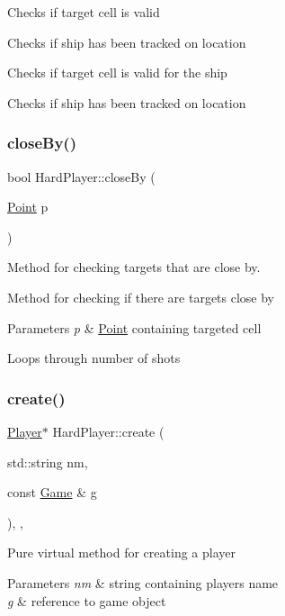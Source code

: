 Checks if target cell is valid

Checks if ship has been tracked on location

Checks if target cell is valid for the ship

Checks if ship has been tracked on location \mbox{\label{class_hard_player_a91cdd6239e111ea02bff561f6a3a0c41}} 
\subsubsection{\texorpdfstring{close\+By()}{closeBy()}}
{\footnotesize\ttfamily bool Hard\+Player\+::close\+By (\begin{DoxyParamCaption}\item[{\mbox{\hyperlink{class_point}{Point}}}]{p }\end{DoxyParamCaption})}



Method for checking target\textquotesingle{}s that are close by. 

Method for checking if there are targets close by 
\begin{DoxyParams}{Parameters}
{\em p} & \mbox{\hyperlink{class_point}{Point}} containing targeted cell \\
\hline
\end{DoxyParams}
Loops through number of shots \mbox{\label{class_hard_player_aa435bcb65ee8b3aea7553196c95fc4e1}} 
\subsubsection{\texorpdfstring{create()}{create()}}
{\footnotesize\ttfamily \mbox{\hyperlink{class_player}{Player}}$\ast$ Hard\+Player\+::create (\begin{DoxyParamCaption}\item[{std\+::string}]{nm,  }\item[{const \mbox{\hyperlink{class_game}{Game}} \&}]{g }\end{DoxyParamCaption})\hspace{0.3cm}{\ttfamily [inline]}, {\ttfamily [override]}, {\ttfamily [virtual]}}

Pure virtual method for creating a player 
\begin{DoxyParams}{Parameters}
{\em nm} & string containing player\textquotesingle{}s name \\
\hline
{\em g} & reference to game object \\
\hline
\end{DoxyParams}


